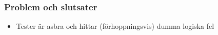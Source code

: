 \documentclass{beamer}
\begin{document}
\begin{frame}
  \frametitle{Problem och slutsater}

  \begin{itemize}
  \item Tester är asbra och hittar (förhoppningsvis) dumma logiska fel
  \end{itemize}
\end{frame}
\end{document}
